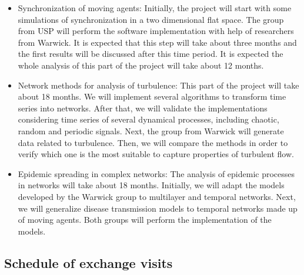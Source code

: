 \begin{itemize}
\item {\hvnb Synchronization of moving agents:} Initially, the project will 
start with some simulations of synchronization in a two dimensional flat space. 
The group from USP will perform the software implementation with help of 
researchers from Warwick. It is expected that this step will take about three 
months and the first results will be discussed after this time period. It is 
expected the whole analysis of this part of the project will take about 12 
months.

\item {\hvnb Network methods for analysis of turbulence:} This part of the 
project will take about 18 months. We will implement several algorithms to 
transform time series into networks. After that, we will validate the 
implementations considering time series of several dynamical processes, 
including chaotic, random and periodic signals. Next, the group from Warwick 
will generate data related to turbulence. Then, we will compare the methods in 
order to verify which one is the most suitable to capture properties of 
turbulent flow.

\item {\hvnb Epidemic spreading in complex networks:} The analysis of epidemic 
processes in networks will take about 18 months. Initially, we will adapt the 
models developed by the Warwick group to multilayer and temporal networks. 
Next, we will generalize disease transmission models to temporal networks made 
up of moving agents. Both groups will perform the implementation of the models.
\end{itemize}

\subsection{Schedule of exchange visits}

